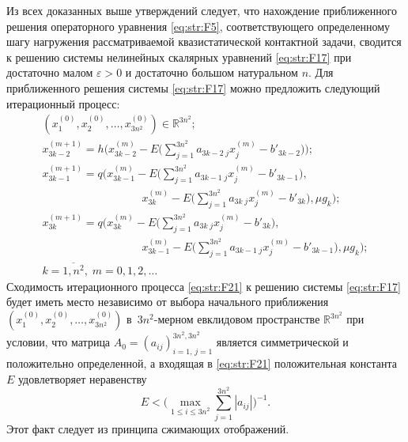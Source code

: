 \smallskip

Из всех доказанных выше утверждений следует, что нахождение приближенного решения операторного уравнения \eqref{eq:str:F5}, соответствующего определенному шагу нагружения рассматриваемой квазистатической контактной задачи, сводится к решению системы нелинейных скалярных уравнений \eqref{eq:str:F17} при достаточно малом $\varepsilon >0$ и достаточно большом натуральном $n$.
Для приближенного решения системы \eqref{eq:str:F17} можно предложить следующий итерационный процесс:
\begin{equation} 
\label{eq:str:F21} 
\begin{array}{l} 
(x_{1}^{(0)} ,x_{2}^{(0)} ,\dots , x_{3n^{2} }^{(0)} )\in \mathbb  R^{3n^{2} } ; 
\\ 
\displaystyle  x_{3k-2}^{(m+1)} =h 
\biggl(x_{3k-2}^{(m)} -E \biggl(\sum _{j=1}^{3n^{2} }a_{3k-2\; j} x_{j}^{(m)} -b'_{3k-2}  \biggr)\biggr);
\\ 
\displaystyle 
x_{3k-1}^{(m+1)} =q\biggl(x_{3k-1}^{(m)} -E \biggl(\sum _{j=1}^{3n^{2} }a_{3k-1 \; j} x_{j}^{(m)} -b'_{3k-1}  \biggr), 
\\
\displaystyle
\hspace{9em} x_{3k}^{(m)} -E  \biggl(\sum _{j=1}^{3n^{2} }a_{3k \; j} x_{j}^{(m)} -b'_{3k}  \biggr),\mu g_{k} \biggr); 
\\ 
\displaystyle 
x_{3k}^{(m+1)} =q\biggl(x_{3k}^{(m)} -E \biggl(\sum _{j=1}^{3n^{2} }a_{3k \; j} x_{j}^{(m)} -b'_{3k}  \biggr),
\\ 
\displaystyle \hspace{9em} x_{3k-1}^{(m)} -E \biggl(\sum _{j=1}^{3n^{2} }a_{3k-1 \; j} x_{j}^{(m)} -b'_{3k-1}  \biggr),\mu g_{k} \biggr); \\ 
k=\overline{1, n^{2} }, \; m=0, 1, 2,\dots
\end{array}
 \end{equation} 
Сходимость итерационного процесса \eqref{eq:str:F21} к решению системы \eqref{eq:str:F17} будет иметь место независимо от выбора начального приближения $(x_{1}^{(0)} ,x_{2}^{(0)} ,\dots, x_{3n^{2} }^{(0)} )$ \linebreak в~$3n^{2} $-мерном евклидовом пространстве $\mathbb R^{3n^{2} } $ при условии, что матрица $A_{0} =(a_{ij})_{i=1,\, j= 1}^{3n^{2}, 3n^{2} }$ является симметрической и положительно определенной, а входящая в \eqref{eq:str:F21} положительная константа $E$ удовлетворяет неравенству 
$$ E< \biggl( \max \limits_{1\le i\le 3n^{2}}  \sum \limits_{j=1}^{3n^{2} }\left|a_{ij} \right| \biggr)^{-1} .$$ 
Этот факт следует из принципа сжимающих отображений.

